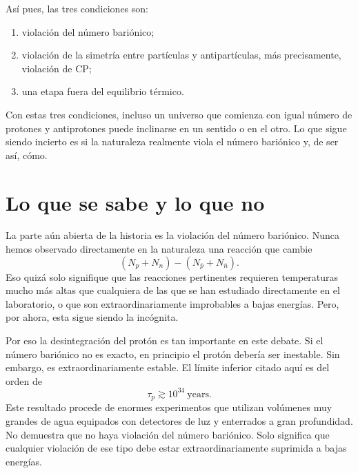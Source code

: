 Así pues, las tres condiciones son:
\begin{enumerate}
\item violación del número bariónico;
\item violación de la simetría entre partículas y antipartículas, más precisamente, violación de CP;
\item una etapa fuera del equilibrio térmico.
\end{enumerate}

\begin{classroomqa}
\end{classroomqa}

Con estas tres condiciones, incluso un universo que comienza con igual número de protones y antiprotones puede inclinarse en un sentido o en el otro. Lo que sigue siendo incierto es si la naturaleza realmente viola el número bariónico y, de ser así, cómo.

\section{Lo que se sabe y lo que no}

La parte aún abierta de la historia es la violación del número bariónico. Nunca hemos observado directamente en la naturaleza una reacción que cambie
\[
(N_p+N_n)-(N_{\bar p}+N_{\bar n}).
\]
Eso quizá solo signifique que las reacciones pertinentes requieren temperaturas mucho más altas que cualquiera de las que se han estudiado directamente en el laboratorio, o que son extraordinariamente improbables a bajas energías. Pero, por ahora, esta sigue siendo la incógnita.

Por eso la desintegración del protón es tan importante en este debate. Si el número bariónico no es exacto, en principio el protón debería ser inestable. Sin embargo, es extraordinariamente estable. El límite inferior citado aquí es del orden de
\[
\tau_p \gtrsim 10^{34}\ \text{years}.
\]
Este resultado procede de enormes experimentos que utilizan volúmenes muy grandes de agua equipados con detectores de luz y enterrados a gran profundidad. No demuestra que no haya violación del número bariónico. Solo significa que cualquier violación de ese tipo debe estar extraordinariamente suprimida a bajas energías.

